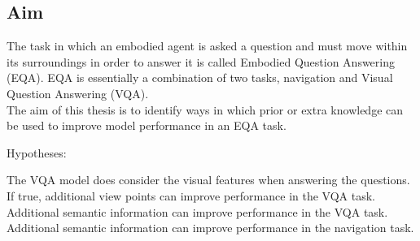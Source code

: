 \documentclass{article}
\begin{document}
\subsection{Aim}
The task in which an embodied agent is asked a question and must move within its surroundings in order to answer it is called Embodied Question Answering (EQA). EQA is essentially a combination of two tasks, navigation and Visual Question Answering (VQA).\\
The aim of this thesis is to identify ways in which prior or extra knowledge can be used to improve model performance in an EQA task. 

Hypotheses: 
\begin{outline}
	\1 The VQA model does consider the visual features when answering the questions.
		\2 If true, additional view points can improve performance in the VQA task. 
	\1 Additional semantic information can improve performance in the VQA task.
	\1 Additional semantic information can improve performance in the navigation task. 
\end{outline}
\end{document}
